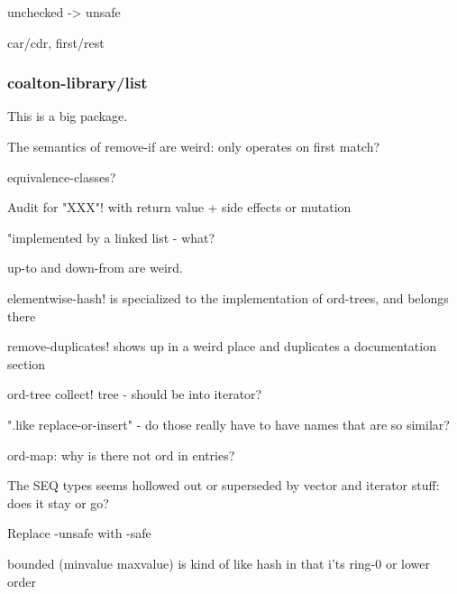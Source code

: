 \documentclass[12pt]{article}
\begin{document}
unchecked -> unsafe

car/cdr,  first/rest

\subsubsection{coalton-library/list}

This is a big package.

The semantics of remove-if are weird: only operates on first match?

equivalence-classes?

Audit for "XXX"! with return value + side effects or mutation

"implemented by a linked list - what?

up-to and down-from are weird.

elementwise-hash! is specialized to the implementation of ord-trees, and belongs there

remove-duplicates! shows up in a weird place and duplicates a documentation section

ord-tree collect! tree - should be into iterator?

".like replace-or-insert" - do those really have to have names that are so similar?

ord-map: why is there not ord in entries?

The SEQ types seems hollowed out or superseded by vector and iterator stuff: does it stay or go?

Replace -unsafe with -safe

bounded (minvalue maxvalue) is kind of like hash in that i'ts ring-0 or lower order
\end{document}
